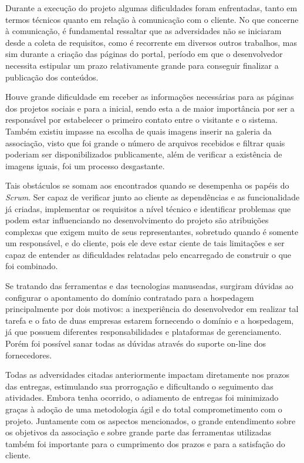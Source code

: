 Durante a execução do projeto algumas dificuldades foram enfrentadas, tanto em termos técnicos quanto em relação à comunicação com o cliente. No que concerne à comunicação, é fundamental ressaltar que as adversidades não se iniciaram desde a coleta de requisitos, como é recorrente em diversos outros trabalhos, mas sim durante a criação das páginas do portal, período em que o desenvolvedor necessita estipular um prazo relativamente grande para conseguir finalizar a publicação dos conteúdos.

Houve grande dificuldade em receber as informações necessárias para as páginas dos projetos sociais e para a inicial, sendo esta a de maior importância por ser a responsável por estabelecer o primeiro contato entre o visitante e o sistema. Também existiu impasse na escolha de quais imagens inserir na galeria da associação, visto que foi grande o número de arquivos recebidos e filtrar quais poderiam ser disponibilizados publicamente, além de verificar a existência de imagens iguais, foi um processo desgastante.

Tais obstáculos se somam aos encontrados quando se desempenha os papéis do \textit{Scrum}. Ser capaz de verificar junto ao cliente as dependências e as funcionalidade já criadas, implementar os requisitos a nível técnico e identificar problemas que podem estar influenciando no desenvolvimento do projeto são atribuições complexas que exigem muito de seus representantes, sobretudo quando é somente um responsável, e do cliente, pois ele deve estar ciente de tais limitações e ser capaz de entender as dificuldades relatadas pelo encarregado de construir o que foi combinado.

Se tratando das ferramentas e das tecnologias manuseadas, surgiram dúvidas ao configurar o apontamento do domínio contratado para a hospedagem principalmente por dois motivos: a inexperiência do desenvolvedor em realizar tal tarefa e o fato de duas empresas estarem fornecendo o domínio e a hospedagem, já que possuem diferentes responsabilidades e plataformas de gerenciamento. Porém foi possível sanar todas as dúvidas através do suporte on-line dos fornecedores.

Todas as adversidades citadas anteriormente impactam diretamente nos prazos das entregas, estimulando sua prorrogação e dificultando o seguimento das atividades. Embora tenha ocorrido, o adiamento de entregas foi minimizado graças à adoção de uma metodologia ágil e do total comprometimento com o projeto. Juntamente com os aspectos mencionados, o grande entendimento sobre os objetivos da associação e sobre grande parte das ferramentas utilizadas também foi importante para o cumprimento dos prazos e para a satisfação do cliente.

